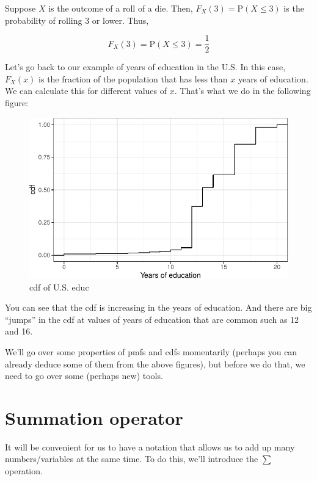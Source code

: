 \documentclass[
  letterpaper,
  DIV=11,
  numbers=noendperiod]{scrreprt}
\begin{document}
Suppose \(X\) is the outcome of a roll of a die. Then,
\(F_X(3) = \mathrm{P}(X \leq 3)\) is the probability of rolling 3 or
lower. Thus,

\[
  F_X(3) = \mathrm{P}(X \leq 3) = \frac{1}{2}
\]

Let's go back to our example of years of education in the U.S. In this
case, \(F_X(x)\) is the fraction of the population that has less than
\(x\) years of education. We can calculate this for different values of
\(x\). That's what we do in the following figure:

\begin{figure}[H]

{\centering \includegraphics{02-probability_files/figure-pdf/unnamed-chunk-4-1.pdf}

}

\caption{cdf of U.S. educ}

\end{figure}%

You can see that the cdf is increasing in the years of education. And
there are big ``jumps'' in the cdf at values of years of education that
are common such as 12 and 16.

We'll go over some properties of pmfs and cdfs momentarily (perhaps you
can already deduce some of them from the above figures), but before we
do that, we need to go over some (perhaps new) tools.

\section{Summation operator}\label{summation-operator}

It will be convenient for us to have a notation that allows us to add up
many numbers/variables at the same time. To do this, we'll introduce the
\(\sum\) operation.
\end{document}
